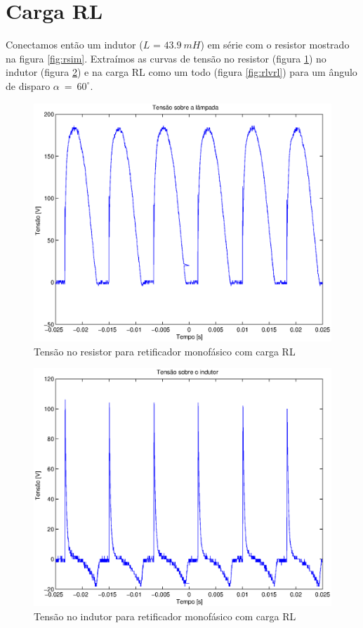 \documentclass{article}
\begin{document}
\section{Carga RL}
Conectamos então um indutor ($L$ = $43.9\ mH$) em série com o resistor mostrado na figura \ref{fig:rsim}. Extraímos as curvas de tensão no resistor (figura \ref{fig:rlvr}) no indutor (figura \ref{fig:rlvl}) e na carga RL como um todo (figura \ref{fig:rlvrl}) para um ângulo de disparo $\alpha\ =\ 60^\circ$.
\begin{figure}[H]
	\centering
	\includegraphics[width=0.7\linewidth]{dados/RL/rl_vr}
	\caption{Tensão no resistor para retificador monofásico com carga RL}
	\label{fig:rlvr}
\end{figure}
\begin{figure}[H]
	\centering
	\includegraphics[width=0.7\linewidth]{dados/RL/r_vl}
	\caption{Tensão no indutor para retificador monofásico com carga RL}
	\label{fig:rlvl}
\end{figure}
\end{document}
